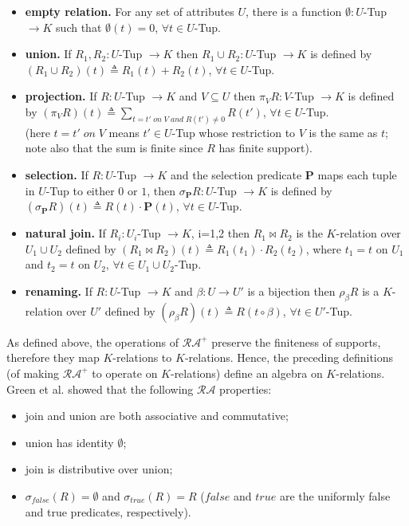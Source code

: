 \begin{itemize}
    \item \textbf{empty relation.} For any set of attributes $U$, there is a function $\emptyset : U$-Tup $ \rightarrow K$ such that $\emptyset(t) = 0$, $\forall t \in U$-Tup.
    \item \textbf{union.} If $R_1, R_2 : U$-Tup $ \rightarrow K$ then $R_1 \cup R_2 : U$-Tup $ \rightarrow K$ is defined by $(R_1 \cup R_2)(t) \triangleq R_1(t) + R_2(t)$, $\forall t \in U$-Tup.
    \item \textbf{projection.} If $R : U$-Tup $ \rightarrow K$ and $V \subseteq U$ then $\pi_VR : V$-Tup $ \rightarrow K$ is defined by $(\pi_VR)(t) \triangleq \sum\limits_{t=t'\;on\;V\;and\;R(t') \neq 0}R(t')$, $\forall t \in U$-Tup.\\
    (here $t=t'\;on\;V$ means $t' \in U$-Tup whose restriction to $V$ is the same as $t$; note also that the sum is finite since $R$ has finite support).
    \item \textbf{selection.} If $R : U$-Tup $ \rightarrow K$ and the selection predicate \textbf{P} maps each tuple in $U$-Tup to either $0$ or $1$, then $\sigma_\textbf{P}R : U$-Tup $ \rightarrow K$ is defined by $(\sigma_\textbf{P}R)(t) \triangleq R(t) \cdot \textbf{P}(t)$, $\forall t \in U$-Tup.
    \item \textbf{natural join\footnotemark.} If $R_i : U_i$-Tup $ \rightarrow K$, i=1,2 then $R_1 \bowtie R_2$ is the $K$-relation over $U_1 \cup U_2$ defined by $(R_1 \bowtie R_2)(t) \triangleq R_1(t_1) \cdot R_2(t_2)$, where $t_1=t$ on $U_1$ and $t_2 = t$ on $U_2$, $\forall t \in U_1 \cup U_2$-Tup.
    \item \textbf{renaming.} If $R : U$-Tup $ \rightarrow K$ and $\beta : U \rightarrow U'$ is a bijection then $\rho_\beta R$ is a $K$-relation over $U'$ defined by $(\rho_\beta R)(t) \triangleq R(t \circ \beta)$, $\forall t \in U'$-Tup.
\end{itemize}
As defined above, the operations of $\mathcal{RA^+}$ preserve the finiteness of supports, therefore they map $K$-relations to $K$-relations. Hence, the preceding definitions (of making $\mathcal{RA^+}$ to operate on $K$-relations) define an algebra on $K$-relations.
Green et al. \cite{green2007provenance} showed that the following $\mathcal{RA}$ properties:
\begin{itemize}
    \item join and union are both associative and commutative;
    \item union has identity $\emptyset$;
    \item join is distributive over union;
    \item $\sigma_{false}(R) = \emptyset$ and $\sigma_{true}(R) = R$ ($false$ and $true$ are the uniformly false and true predicates, respectively).
\end{itemize}
